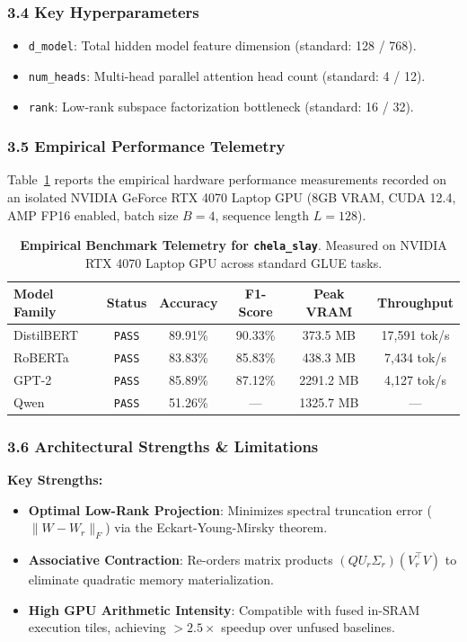 \subsubsection*{3.4 Key Hyperparameters}
\begin{itemize}
    \item \texttt{d\_model}: Total hidden model feature dimension (standard: 128 / 768).
    \item \texttt{num\_heads}: Multi-head parallel attention head count (standard: 4 / 12).
    \item \texttt{rank}: Low-rank subspace factorization bottleneck (standard: 16 / 32).
\end{itemize}

\subsubsection*{3.5 Empirical Performance Telemetry}
Table~\ref{tab:telemetry_chela_slay} reports the empirical hardware performance measurements recorded on an isolated NVIDIA GeForce RTX 4070 Laptop GPU (8GB VRAM, CUDA 12.4, AMP FP16 enabled, batch size $B=4$, sequence length $L=128$).

\begin{table}[h]
\centering
\small
\caption{\textbf{Empirical Benchmark Telemetry for \texttt{chela\_slay}}. Measured on NVIDIA RTX 4070 Laptop GPU across standard GLUE tasks.}
\label{tab:telemetry_chela_slay}
\begin{tabular*}{\columnwidth}{@{\extracolsep{\fill}}lccccc}
\toprule
\textbf{Model Family} & \textbf{Status} & \textbf{Accuracy} & \textbf{F1-Score} & \textbf{Peak VRAM} & \textbf{Throughput} \\
\midrule
DistilBERT & \texttt{PASS} & 89.91\% & 90.33\% & 373.5 MB & 17,591 tok/s \\
RoBERTa & \texttt{PASS} & 83.83\% & 85.83\% & 438.3 MB & 7,434 tok/s \\
GPT-2 & \texttt{PASS} & 85.89\% & 87.12\% & 2291.2 MB & 4,127 tok/s \\
Qwen & \texttt{PASS} & 51.26\% & --- & 1325.7 MB & --- \\
\bottomrule
\end{tabular*}
\end{table}

\subsubsection*{3.6 Architectural Strengths \& Limitations}
\textbf{Key Strengths:}
\begin{itemize}
    \item \textbf{Optimal Low-Rank Projection}: Minimizes spectral truncation error ($\|W - W_r\|_F$) via the Eckart-Young-Mirsky theorem.
    \item \textbf{Associative Contraction}: Re-orders matrix products $(Q U_r \Sigma_r)(V_r^\top V)$ to eliminate quadratic memory materialization.
    \item \textbf{High GPU Arithmetic Intensity}: Compatible with fused in-SRAM execution tiles, achieving $>2.5\times$ speedup over unfused baselines.
\end{itemize}

